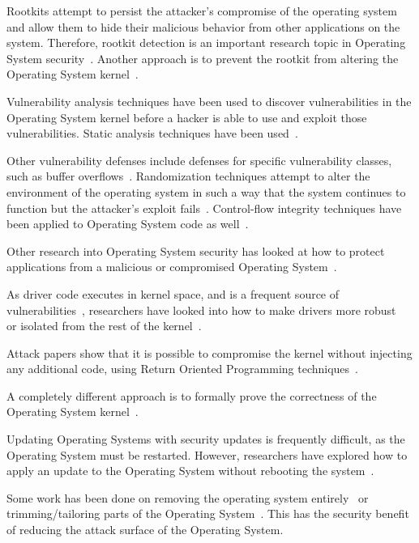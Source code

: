 \documentclass[11pt,letterpaper]{article}
\begin{document}
Rootkits attempt to persist the attacker's compromise of the operating
system and allow them to hide their malicious behavior from other
applications on the system. Therefore, rootkit detection is an
important research topic in Operating System
security~\cite{petroni2004, wang2005, petroni2007, payne2008,
  sharif2009, yin2010, bianchi2012}. Another approach is to prevent
the rootkit from altering the Operating System
kernel~\cite{riley2008, wang2009, grace2010, gadaleta2011}.

Vulnerability analysis techniques have been used to discover
vulnerabilities in the Operating System kernel before a hacker is able
to use and exploit those vulnerabilities. Static analysis techniques
have been used~\cite{chou2001, chen2011}.

Other vulnerability defenses include defenses for specific
vulnerability classes, such as buffer overflows~\cite{dalton2008}.
Randomization techniques attempt to alter the environment of the
operating system in such a way that the system continues to function
but the attacker's exploit fails~\cite{lin2009, giuffrida2012}.
Control-flow integrity techniques have been applied to Operating
System code as well~\cite{li2011a}.

Other research into Operating System security has looked at how to
protect applications from a malicious or compromised Operating
System~\cite{ta-min2006, onarlioglu2013, li2014}.

As driver code executes in kernel space, and is a frequent source of
vulnerabilities~\cite{kadav2012}, researchers have looked into how to
make drivers more robust~\cite{ganapathy2008, hruby2012} or isolated
from the rest of the kernel~\cite{boyd-wickizer2010}.

Attack papers show that it is possible to compromise the kernel
without injecting any additional code, using Return Oriented
Programming techniques~\cite{hund2009}.

A completely different approach is to formally prove the correctness
of the Operating System kernel~\cite{klein2009}.

Updating Operating Systems with security updates is frequently
difficult, as the Operating System must be restarted. However,
researchers have explored how to apply an update to the Operating
System without rebooting the system~\cite{arnold2009}.

Some work has been done on removing the operating system
entirely~\cite{madhavapeddy2010} or trimming/tailoring parts of the
Operating System~\cite{kurmus2011, madhavapeddy2013, howell2013,
  kurmus2013, kurmus2014}. This has the security benefit of reducing
the attack surface of the Operating System.
\end{document}
